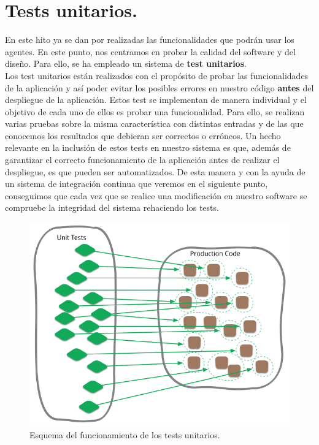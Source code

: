 \section{Tests unitarios.}

En este hito ya se dan por realizadas las funcionalidades que podrán usar los agentes. En este punto, nos centramos en probar la calidad del software y del diseño.
Para ello, se ha empleado un sistema de \textbf{test unitarios}.\\

Los test unitarios están realizados con el propósito de probar las funcionalidades de la aplicación y así poder evitar los posibles errores en nuestro código \textbf{antes}
del despliegue de la aplicación. Estos test se implementan de manera individual y el objetivo de cada uno de ellos es probar una funcionalidad. Para ello, se realizan varias
pruebas sobre la misma característica con distintas entradas y de las que conocemos los resultados que debieran ser correctos o erróneos. Un hecho relevante en la inclusión
de estos tests en nuestro sistema es que, además de garantizar el correcto funcionamiento de la aplicación antes de realizar el despliegue, es que pueden ser automatizados. 
De esta manera y con la ayuda de un sistema de integración continua que veremos en el siguiente punto, conseguimos que cada vez que se realice una modificación en nuestro software
se compruebe la integridad del sistema rehaciendo los tests.\\

\begin{figure}[H]
	\centering
	\includegraphics[scale=0.45]{imagenes/unit-test.png}
	\caption{Esquema del funcionamiento de los tests unitarios. \label{fig:figura13}}
\end{figure}

